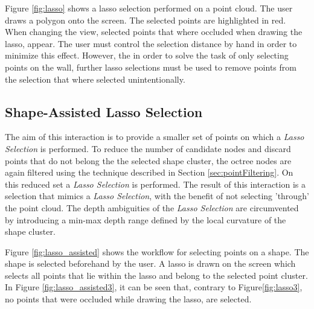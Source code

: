 Figure \ref{fig:lasso} shows a lasso selection performed on a point cloud. The user draws a polygon onto the screen. The selected points are highlighted in red. When changing the view, selected points that where occluded when drawing the lasso, appear. The user must control the selection distance by hand in order to minimize this effect. However, the in order to solve the task of only selecting points on the wall, further lasso selections must be used to remove points from the selection that where selected unintentionally. 



\subsection{Shape-Assisted Lasso Selection}
The aim of this interaction is to provide a smaller set of points on which a \textit{Lasso Selection} is performed.  To reduce the number of candidate nodes and discard points that do not belong the the selected shape cluster, the octree nodes are again filtered using the technique described in Section \ref{sec:pointFiltering}. On this reduced set a \textit{Lasso Selection} is performed. The result of this interaction is a selection that mimics a \textit{Lasso Selection}, with the benefit of not selecting 'through' the point cloud. The depth ambiguities of the \textit{Lasso Selection} are circumvented by introducing a min-max depth range defined by the local curvature of the shape cluster. 

Figure \ref{fig:lasso_assisted} shows the workflow for selecting points on a shape. The shape is selected beforehand by the user. A lasso is drawn on the screen which selects all points that lie within the lasso and belong to the selected point cluster. In Figure \ref{fig:lasso_assisted3}, it can be seen that, contrary to Figure\ref{fig:lasso3}, no points that were occluded while drawing the lasso, are selected. 


